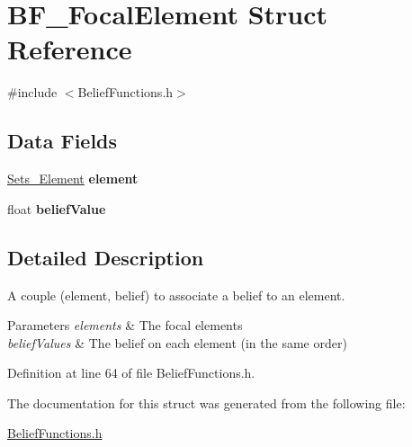 \hypertarget{struct_b_f___focal_element}{
\section{BF\_\-FocalElement Struct Reference}
\label{struct_b_f___focal_element}
}


{\ttfamily \#include $<$BeliefFunctions.h$>$}

\subsection*{Data Fields}
\begin{DoxyCompactItemize}
\item 
\hypertarget{struct_b_f___focal_element_a9a710ad49ddbc706371fa96ab1d1a4fa}{
\hyperlink{struct_sets___element}{Sets\_\-Element} {\bfseries element}}
\label{struct_b_f___focal_element_a9a710ad49ddbc706371fa96ab1d1a4fa}

\item 
\hypertarget{struct_b_f___focal_element_a59bb288073cdc2754b6d0ebc93b478d0}{
float {\bfseries beliefValue}}
\label{struct_b_f___focal_element_a59bb288073cdc2754b6d0ebc93b478d0}

\end{DoxyCompactItemize}


\subsection{Detailed Description}
A couple (element, belief) to associate a belief to an element. 
\begin{DoxyParams}{Parameters}
{\em elements} & The focal elements \\
\hline
{\em beliefValues} & The belief on each element (in the same order) \\
\hline
\end{DoxyParams}


Definition at line 64 of file BeliefFunctions.h.



The documentation for this struct was generated from the following file:\begin{DoxyCompactItemize}
\item 
\hyperlink{_belief_functions_8h}{BeliefFunctions.h}\end{DoxyCompactItemize}

